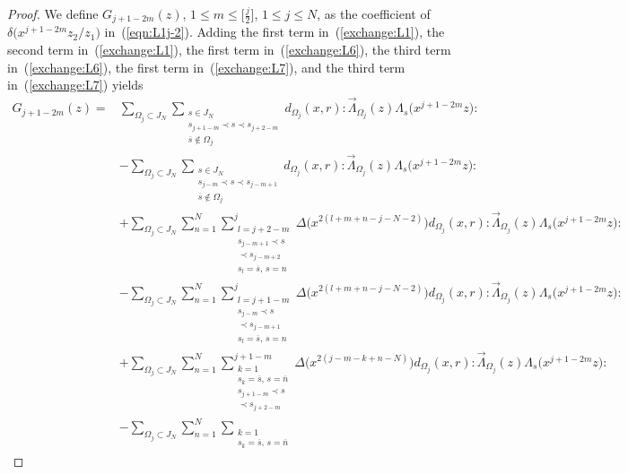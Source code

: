 \documentclass[pdftex]{sigma}
\numberwithin{equation}{section}
\begin{document}
\begin{proof}
We define ${G}_{j+1-2m}(z)$, $1\leq m \leq \big[\frac{j}{2}\big]$, $1\leq j \leq N$,
as the coefficient of $\delta\big(x^{j+1-2m}z_2/z_1\big)$ in~(\ref{eqn:L1j-2}).
Adding the first term in~(\ref{exchange:L1}),
the second term in~(\ref{exchange:L1}), the first term in~(\ref{exchange:L6}),
the third term in~(\ref{exchange:L6}), the first term in~(\ref{exchange:L7}),
and the third term in~(\ref{exchange:L7}) yields
\begin{align*}
{G}_{j+1-2m}(z)={}&\sum_{\Omega_j \subset J_N}
\sum\limits_{\substack{s \in J_N\\s_{j+1-m} \prec s \prec s_{j+2-m}
\\ \overline{s} \notin \Omega_j}}
d_{\Omega_j}(x,r){:}\overrightarrow{\Lambda}_{\Omega_j}(z)
\Lambda_s\big(x^{j+1-2m}z\big) {:}
\\
&-\sum_{\Omega_j \subset J_N}\sum\limits_{\substack{s\in J_N\\s_{j-m} \prec s \prec s_{j-m+1}
\\ \overline{s} \notin \Omega_j}}d_{\Omega_j}(x,r)
{:}\overrightarrow{\Lambda}_{\Omega_j}(z)
\Lambda_s\big(x^{j+1-2m}z\big){:}
\\
&+\sum_{\Omega_j \subset J_N}\sum_{n=1}^N\sum\limits_{\substack{l=j+2-m
\\s_{j-m+1} \prec s\\ \prec s_{j-m+2}\\ s_l=\overline{s},\, s=n}}^j
\Delta\big(x^{2(l+m+n-j-N-2)}\big) d_{\Omega_j}(x,r)
{:}\overrightarrow{\Lambda}_{\Omega_j}(z)\Lambda_s\big(x^{j+1-2m}z\big){:}
\\
&-\sum_{\Omega_j \subset J_N}\sum_{n=1}^N\sum\limits_{\substack{l=j+1-m
\\s_{j-m} \prec s\\ \prec s_{j-m+1}\\ s_l=\overline{s},\, s=n}}^j
\Delta\big(x^{2(l+m+n-j-N-2)}\big) d_{\Omega_j}(x,r)
{:}\overrightarrow{\Lambda}_{\Omega_j}(z)\Lambda_s\big(x^{j+1-2m}z\big){:}
\\
&+\sum_{\Omega_j \subset J_N}\sum_{n=1}^N
\sum\limits_{\substack{k=1
\\ s_k=\overline{s},\, s=\overline{n}\\ s_{j+1-m} \prec s\\ \prec s_{j+2-m}}}^{j+1-m}
\Delta\big(x^{2(j-m-k+n-N)}\big) d_{\Omega_j}(x,r)
{:}\overrightarrow{\Lambda}_{\Omega_j}(z)\Lambda_s\big(x^{j+1-2m}z\big){:}
\\
&-\sum_{\Omega_j \subset J_N}\sum_{n=1}^N
\sum\limits_{\substack{k=1\\ s_k=\overline{s},\, s=\overline{n}
}}
\end{align*}
\end{proof}
\end{document}

